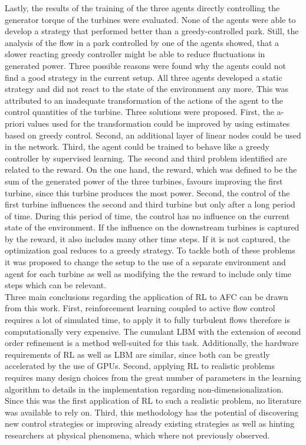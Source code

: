 Lastly, the results of the training of the three agents directly controlling the generator torque of the turbines were evaluated. None of the agents were able to develop a strategy that performed better than a greedy-controlled park. Still, the analysis of the flow in a park controlled by one of the agents showed, that a slower reacting greedy controller might be able to reduce fluctuations in generated power. Three possible reasons were found why the agents could not find a good strategy in the current setup. All three agents developed a static strategy and did not react to the state of the environment any more. This was attributed to an inadequate transformation of the actions of the agent to the control quantities of the turbine. Three solutions were proposed. First, the a-priori values used for the transformation could be improved by using estimates based on greedy control. Second, an additional layer of linear nodes could be used in the network. Third, the agent could be trained to behave like a greedy controller by supervised learning. The second and third problem identified are related to the reward. On the one hand, the reward, which was defined to be the sum of the generated power of the three turbines, favours improving the first turbine, since this turbine produces the most power. Second, the control of the first turbine influences the second and third turbine but only after a long period of time. During this period of time, the control has no influence on the current state of the environment. If the influence on the downstream turbines is captured by the reward, it also includes many other time steps. If it is not captured, the optimization goal reduces to a greedy strategy. To tackle both of these problems it was proposed to change the setup to the use of a separate environment and agent for each turbine as well as modifying the the reward to include only time steps which can be relevant. \\
Three main conclusions regarding the application of RL to AFC can be drawn from this work. First, reinforcement learning coupled to active flow control requires a lot of simulated time, to apply it to fully turbulent flows therefore is computationally very expensive. The cumulant LBM with the extension of second order refinement is a method well-suited for this task. Additionally, the hardware requirements of RL as well as LBM are similar, since both can be greatly accelerated by the use of GPUs. Second, applying RL to realistic problems requires many design choices from the great number of parameters in the learning algorithm to details in the implementation regarding non-dimensionalization. Since this was the first application of RL to such a realistic problem, no literature was available to rely on. Third, this methodology has the potential of discovering new control strategies or improving already existing strategies as well as hinting researchers at physical phenomena, which where not previously observed. \\
